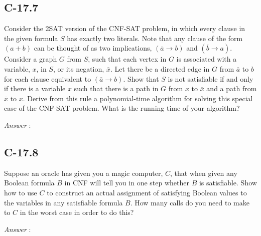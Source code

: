 \documentclass[11pt]{article}
\begin{document}
\subsection{C-17.7}
Consider the 2SAT version of the CNF-SAT problem, in which every clause in the given formula $S$ has exactly two literals. Note that any clause of the form $(a + b)$ can be thought of as two implications, $(\overline{a} \rightarrow b)$ and $(\overline{b} \rightarrow a)$. Consider a graph $G$ from $S$, such that each vertex in $G$ is associated with a variable, $x$, in $S$, or its negation, $\overline{x}$. Let there be a directed edge in $G$ from $\overline{a}$ to $b$ for each clause equivalent to $(\overline{a} \rightarrow b)$. Show that $S$ is not satisfiable if and only if there is a variable $x$ such that there is a path in $G$ from $x$ to $\overline{x}$ and a path from $\overline{x}$ to $x$. Derive from this rule a polynomial-time algorithm for solving this special case of the CNF-SAT problem. What is the running time of your algorithm?

\noindent\emph{Answer} : 
\subsection{C-17.8}
Suppose an oracle has given you a magic computer, $C$, that when given any Boolean formula $B$ in CNF will tell you in one step whether $B$ is satisfiable. Show how to use $C$ to construct an actual assignment of satisfying Boolean values to the variables in any satisfiable formula $B$. How many calls do you need to make to $C$ in the worst case in order to do this?

\noindent\emph{Answer} : 
\end{document}
